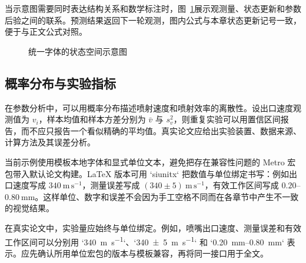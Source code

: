 当示意图需要同时表达结构关系和数学标注时，图~\ref{fig:state-space-diagram}展示观测量、状态更新和参数后验之间的联系。预测结果返回下一轮观测，图内公式与本章状态更新记号一致，便于与正文公式对照。
\begin{figure}[htbp]
  \centering
  \caption{统一字体的状态空间示意图}
  \label{fig:state-space-diagram}
\end{figure}

\subsection{概率分布与实验指标}

在参数分析中，可以用概率分布描述喷射速度和喷射效率的离散性。设出口速度观测值为 $v_i$，样本均值和样本方差分别为 $\bar{v}$ 与 $s_v^2$，则重复实验可以用置信区间报告，而不应只报告一个看似精确的平均值。真实论文应给出实验装置、数据来源、计算方法及其误差分析。

当前示例使用模板本地字体和显式单位文本，避免把存在兼容性问题的 Metro 宏包带入默认论文构建。LaTeX 版本可用 `siunitx` 把数值与单位绑定书写：例如出口速度写成 $340~\mathrm{m\,s^{-1}}$，测量误差写成 $(340\pm5)~\mathrm{m\,s^{-1}}$，有效工作区间写成 $0.20$--$0.80~\mathrm{mm}$。这样单位、数字和误差不会因为手工空格不同而在各章节中产生不一致的视觉结果。

在真实论文中，实验量应始终与单位绑定。例如，喷嘴出口速度、测量误差和有效工作区间可以分别用 `\qty{340}{\meter\per\second}`、`\qty{340 \pm 5}{\meter\per\second}` 和 `\qtyrange{0.20}{0.80}{\milli\meter}` 表示。应先确认所用单位宏包的版本与模板兼容，再将同一接口用于全文。

